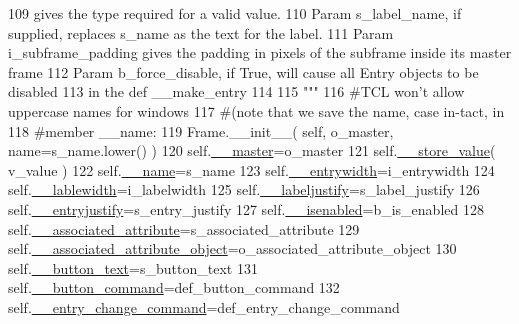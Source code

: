 \begin{DoxyCode}
109 \textcolor{stringliteral}{              gives the type required for a valid value.}
110 \textcolor{stringliteral}{        Param s\_label\_name, if supplied, replaces s\_name as the text for the label.}
111 \textcolor{stringliteral}{        Param i\_subframe\_padding gives the padding in pixels of the subframe inside its master frame}
112 \textcolor{stringliteral}{        Param b\_force\_disable, if True, will cause all Entry objects to be disabled }
113 \textcolor{stringliteral}{              in the def \_\_make\_entry}
114 \textcolor{stringliteral}{}
115 \textcolor{stringliteral}{        """}
116         \textcolor{comment}{#TCL won't allow uppercase names for windows}
117         \textcolor{comment}{#(note that we save the name, case in-tact, in}
118         \textcolor{comment}{#member \_\_name:}
119         Frame.\_\_init\_\_( self, o\_master, name=s\_name.lower() )
120         self.\hyperlink{classnegui_1_1pgguiutilities_1_1KeyValFrame_a59eae02effdbbbb9e3cf3e523639e8a8}{\_\_master}=o\_master
121         self.\hyperlink{classnegui_1_1pgguiutilities_1_1KeyValFrame_abb469e367148bbf7c3fb27a523360016}{\_\_store\_value}( v\_value )
122         self.\hyperlink{classnegui_1_1pgguiutilities_1_1KeyValFrame_a08a3969c0310f969954e2b7fdd57a440}{\_\_name}=s\_name
123         self.\hyperlink{classnegui_1_1pgguiutilities_1_1KeyValFrame_a3b64ca90cda3d4031e6a637a51c5124e}{\_\_entrywidth}=i\_entrywidth
124         self.\hyperlink{classnegui_1_1pgguiutilities_1_1KeyValFrame_a3d346c456ee536a5404a2a9f94a7a341}{\_\_lablewidth}=i\_labelwidth
125         self.\hyperlink{classnegui_1_1pgguiutilities_1_1KeyValFrame_a0b4d970d0edce0eb0a7d5fd20c7da5b8}{\_\_labeljustify}=s\_label\_justify
126         self.\hyperlink{classnegui_1_1pgguiutilities_1_1KeyValFrame_a4d0dae8b1d43e1804727b3dfe1ba3383}{\_\_entryjustify}=s\_entry\_justify
127         self.\hyperlink{classnegui_1_1pgguiutilities_1_1KeyValFrame_a02d9e7225b8a2fb0eda398e68991e0e8}{\_\_isenabled}=b\_is\_enabled
128         self.\hyperlink{classnegui_1_1pgguiutilities_1_1KeyValFrame_a27b2ed9e7eeccc56397136ba42ccdaeb}{\_\_associated\_attribute}=s\_associated\_attribute
129         self.\hyperlink{classnegui_1_1pgguiutilities_1_1KeyValFrame_a73863067b82206c4f7d307be73ae5cd7}{\_\_associated\_attribute\_object}=o\_associated\_attribute\_object
130         self.\hyperlink{classnegui_1_1pgguiutilities_1_1KeyValFrame_abcbe36760268b6a6f2436527e3b45a77}{\_\_button\_text}=s\_button\_text
131         self.\hyperlink{classnegui_1_1pgguiutilities_1_1KeyValFrame_a0a4e9593fba1c3c0defc524ada661261}{\_\_button\_command}=def\_button\_command
132         self.\hyperlink{classnegui_1_1pgguiutilities_1_1KeyValFrame_ab739e0f7c56624637e862d2c1fcf1d7c}{\_\_entry\_change\_command}=def\_entry\_change\_command

\end{DoxyCode}
